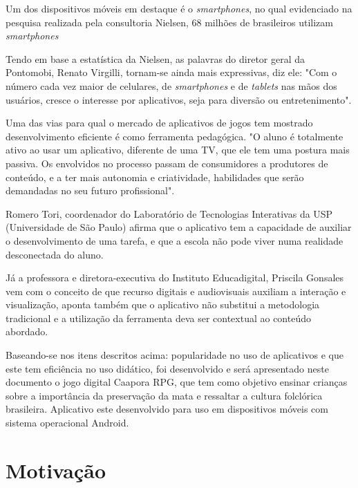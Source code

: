 Um dos dispositivos móveis em destaque é o \textit{smartphones}, no qual evidenciado na pesquisa realizada pela consultoria Nielsen, 68 milhões de brasileiros utilizam \textit{smartphones} \cite{nie} 

Tendo em base a estatística da Nielsen, as palavras do diretor geral da Pontomobi, Renato Virgilli, tornam-se ainda mais expressivas, diz ele: "Com o número cada vez maior de celulares, de \textit{smartphones} e de \textit{tablets} nas mãos dos usuários, cresce o interesse por aplicativos, seja para diversão ou entretenimento". \cite{vir}

Uma das vias para qual o mercado de aplicativos de jogos tem mostrado desenvolvimento eficiente é como ferramenta pedagógica.
"O aluno é totalmente ativo ao usar um aplicativo, diferente de uma TV, que ele tem uma postura mais passiva. Os envolvidos no processo passam de consumidores a produtores de conteúdo, e a ter mais autonomia e criatividade, habilidades que serão demandadas no seu futuro profissional".

Romero Tori, coordenador do Laboratório de Tecnologias Interativas da USP (Universidade de São Paulo) afirma que o aplicativo tem a capacidade de auxiliar o desenvolvimento de uma tarefa, e que a escola não pode viver numa realidade desconectada do aluno.

Já a professora e diretora-executiva do Instituto Educadigital, Priscila Gonsales vem com o conceito de que recurso digitais e audiovisuais auxiliam a interação e visualização, aponta também que o aplicativo não substitui a metodologia tradicional e a utilização da ferramenta deva ser contextual ao conteúdo abordado. \cite{tori}

Baseando-se nos itens descritos acima: popularidade no uso de aplicativos e que este tem eficiência no uso didático, foi desenvolvido e será apresentado neste documento o jogo digital Caapora RPG, que tem como objetivo ensinar crianças sobre a importância da preservação da mata e ressaltar a cultura folclórica brasileira.
Aplicativo este desenvolvido para uso em  dispositivos móveis com sistema operacional Android.

\section{Motivação}
\label{cap:motivacao}

